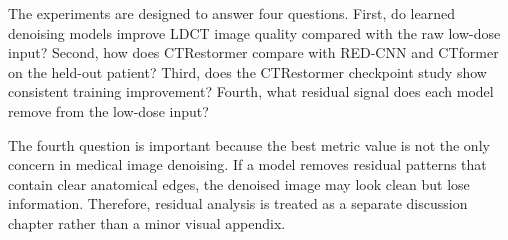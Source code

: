 The experiments are designed to answer four questions. First, do learned denoising models improve LDCT image quality compared with the raw low-dose input? Second, how does CTRestormer compare with RED-CNN and CTformer on the held-out patient? Third, does the CTRestormer checkpoint study show consistent training improvement? Fourth, what residual signal does each model remove from the low-dose input?

The fourth question is important because the best metric value is not the only concern in medical image denoising. If a model removes residual patterns that contain clear anatomical edges, the denoised image may look clean but lose information. Therefore, residual analysis is treated as a separate discussion chapter rather than a minor visual appendix.
